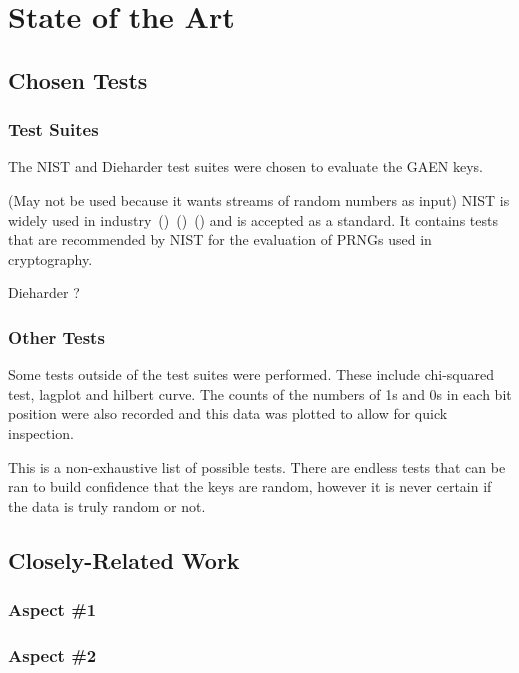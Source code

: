 \chapter{State of the Art}
\section{Chosen Tests}

\subsection{Test Suites}

The NIST and Dieharder test suites were chosen to evaluate the GAEN keys. 

(May not be used because it wants streams of random numbers as input) NIST is widely used in industry~(\cite{9209663})~(\cite{9232553})~(\cite{6236554}) and is accepted as a standard. It contains tests that are recommended by NIST for the evaluation of PRNGs used in cryptography. \par

Dieharder ?

\subsection{Other Tests}

Some tests outside of the test suites were performed. These include chi-squared test, lagplot and hilbert curve. 
The counts of the numbers of 1s and 0s in each bit position were also recorded and this data was plotted to allow for quick inspection. \par

This is a non-exhaustive list of possible tests. There are endless tests that can be ran to build confidence that the keys are random, however it is never certain if the data is truly random or not.

\section{Closely-Related Work}
\subsection{Aspect \#1}


\subsection{Aspect \#2}

